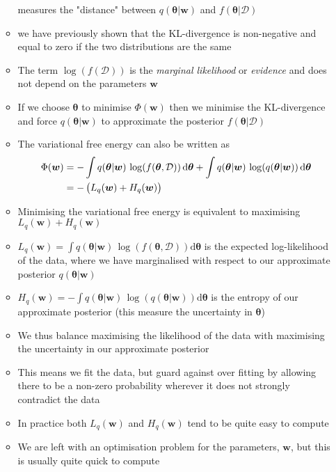 \documentclass[11pt]{article}
\newcommand{\logg}[1]{\log\!\left( #1 \right)}
\newcommand{\dd}{\mathrm{d}}
\begin{document}
\begin{itemize}
\begin{itemize}
 measures the "distance" between \(q(\bm{\theta}|\bm{w})\) and
\(f(\bm{\theta}|\mathcal{D})\)
\item we have previously shown that the KL-divergence is
non-negative and equal to zero if the two distributions are
the same
\item The term \(\logg{f(\mathcal{D})}\) is the \emph{marginal likelihood}
or \emph{evidence} and does not depend on the parameters \(\bm{w}\)
\item If we choose \(\bm{\theta}\) to minimise \(\Phi(\bm{w})\) then we
minimise the KL-divergence and force \(q(\bm{\theta}|\bm{w})\)
to approximate the posterior \(f(\bm{\theta}|\mathcal{D})\)
\item The variational free energy can also be written as
\begin{align*}
 \Phi(\bm{w}) &= -\int q(\bm{\theta}|\bm{w}) \,
 \logg{f(\bm{\theta},\mathcal{D})}   \dd \bm{\theta} +
 \int q(\bm{\theta}|\bm{w}) \,\logg{q(\bm{\theta}|\bm{w})}
 \dd \bm{\theta} \\
 &= - \left( \strut L_{q}(\bm{w}) + H_{q}(\bm{w}) \right)
\end{align*}
\item Minimising the variational free energy is equivalent to
maximising \(L_{q}(\bm{w}) + H_{q}(\bm{w})\)
\item \(L_{q}(\bm{w}) = \int q(\bm{\theta}|\bm{w}) \,
        \logg{f(\bm{\theta},\mathcal{D})}   \dd \bm{\theta}\)
 is the expected log-likelihood of the data, where we have
marginalised with respect to our approximate posterior
\(q(\bm{\theta}|\bm{w})\)
\item \(H_{q}(\bm{w}) = - \int q(\bm{\theta}|\bm{w})
       \,\logg{q(\bm{\theta}|\bm{w})} \dd \bm{\theta}\) is the entropy
of our approximate posterior (this measure the uncertainty in
\(\bm{\theta}\))
\item We thus balance maximising the likelihood of the data with
maximising the uncertainty in our approximate posterior
\item This means we fit the data, but guard against over fitting by
allowing there to be a non-zero probability wherever it does
not strongly contradict the data
\item In practice both \(L_{q}(\bm{w})\) and \(H_{q}(\bm{w})\) tend to be
quite easy to compute
\item We are left with an optimisation problem for the parameters,
\(\bm{w}\), but this is usually quite quick to compute
\end{itemize}
\end{itemize}
\end{document}
